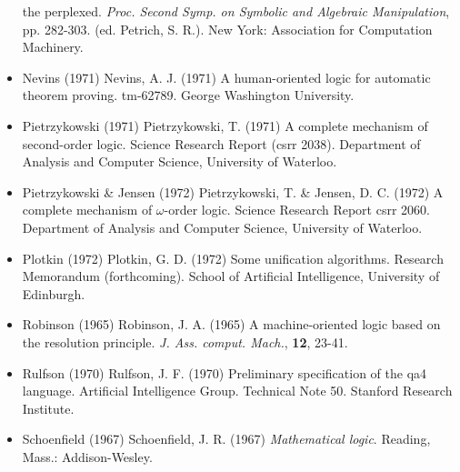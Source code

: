 \documentclass[letterpaper]{report}
\begin{document}
\begin{itemize}[label={}, itemsep=8pt]
	the perplexed. \emph{Proc. Second Symp. on Symbolic and Algebraic
		Manipulation}, pp. 282-303. (ed. Petrich, S. R.). New York:
	Association for Computation Machinery.
	\item
	Nevins (1971) Nevins, A. J. (1971) A human-oriented logic for
	automatic theorem proving. tm-62789. George Washington University.
	\item
	Pietrzykowski (1971) Pietrzykowski, T. (1971) A complete mechanism of
	second-order logic. Science Research Report (csrr 2038). Department of
	Analysis and Computer Science, University of Waterloo.
	\item
	Pietrzykowski \& Jensen (1972) Pietrzykowski, T. \& Jensen, D. C.
	(1972) A complete mechanism of $\omega$-order logic. Science
	Research Report csrr 2060. Department of Analysis and Computer
	Science, University of Waterloo.
	\item
	Plotkin (1972) Plotkin, G. D. (1972) Some unification algorithms.
	Research Memorandum (forthcoming). School of Artificial Intelligence,
	University of Edinburgh.
	\item
	Robinson (1965) Robinson, J. A. (1965) A machine-oriented logic based
	on the resolution principle. \emph{J. Ass. comput. Mach.},
	\textbf{12}, 23-41.
	\item
	Rulfson (1970) Rulfson, J. F. (1970) Preliminary specification of the
	qa4 language. Artificial Intelligence Group. Technical Note 50.
	Stanford Research Institute.
	\item
	Schoenfield (1967) Schoenfield, J. R. (1967) \emph{Mathematical
		logic}. Reading, Mass.: Addison-Wesley.
\end{itemize}
\end{document}
